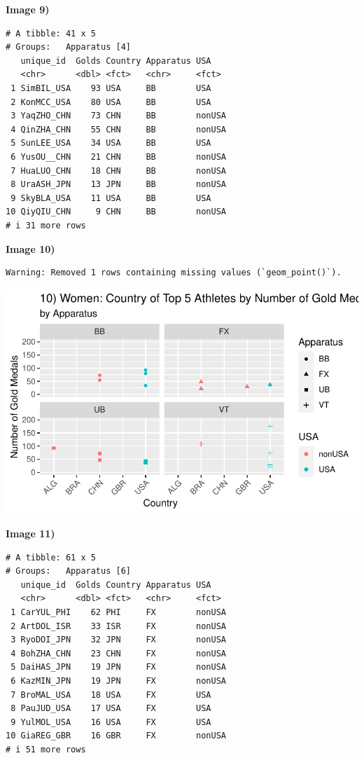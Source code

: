 \documentclass[
  letterpaper,
  DIV=11,
  numbers=noendperiod]{scrartcl}
\begin{document}
\textbf{Image 9)}

\begin{verbatim}
# A tibble: 41 x 5
# Groups:   Apparatus [4]
   unique_id  Golds Country Apparatus USA   
   <chr>      <dbl> <fct>   <chr>     <fct> 
 1 SimBIL_USA    93 USA     BB        USA   
 2 KonMCC_USA    80 USA     BB        USA   
 3 YaqZHO_CHN    73 CHN     BB        nonUSA
 4 QinZHA_CHN    55 CHN     BB        nonUSA
 5 SunLEE_USA    34 USA     BB        USA   
 6 YusOU__CHN    21 CHN     BB        nonUSA
 7 HuaLUO_CHN    18 CHN     BB        nonUSA
 8 UraASH_JPN    13 JPN     BB        nonUSA
 9 SkyBLA_USA    11 USA     BB        USA   
10 QiyQIU_CHN     9 CHN     BB        nonUSA
# i 31 more rows
\end{verbatim}

\textbf{Image 10)}

\begin{verbatim}
Warning: Removed 1 rows containing missing values (`geom_point()`).
\end{verbatim}

\includegraphics{Main_files/figure-pdf/unnamed-chunk-9-1.pdf}

\textbf{Image 11)}

\begin{verbatim}
# A tibble: 61 x 5
# Groups:   Apparatus [6]
   unique_id  Golds Country Apparatus USA   
   <chr>      <dbl> <fct>   <chr>     <fct> 
 1 CarYUL_PHI    62 PHI     FX        nonUSA
 2 ArtDOL_ISR    33 ISR     FX        nonUSA
 3 RyoDOI_JPN    32 JPN     FX        nonUSA
 4 BohZHA_CHN    23 CHN     FX        nonUSA
 5 DaiHAS_JPN    19 JPN     FX        nonUSA
 6 KazMIN_JPN    19 JPN     FX        nonUSA
 7 BroMAL_USA    18 USA     FX        USA   
 8 PauJUD_USA    17 USA     FX        USA   
 9 YulMOL_USA    16 USA     FX        USA   
10 GiaREG_GBR    16 GBR     FX        nonUSA
# i 51 more rows
\end{verbatim}
\end{document}
